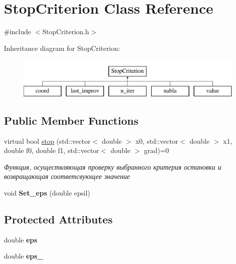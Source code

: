 \hypertarget{class_stop_criterion}{}\section{Stop\+Criterion Class Reference}
\label{class_stop_criterion}


{\ttfamily \#include $<$Stop\+Criterion.\+h$>$}

Inheritance diagram for Stop\+Criterion\+:\begin{figure}[H]
\begin{center}
\leavevmode
\includegraphics[height=2.000000cm]{class_stop_criterion}
\end{center}
\end{figure}
\subsection*{Public Member Functions}
\begin{DoxyCompactItemize}
\item 
\mbox{\label{class_stop_criterion_a5d6cb226bf9fc09d2924941f382f945a}} 
virtual bool \mbox{\hyperlink{class_stop_criterion_a5d6cb226bf9fc09d2924941f382f945a}{stop}} (std\+::vector$<$ double $>$ x0, std\+::vector$<$ double $>$ x1, double f0, double f1, std\+::vector$<$ double $>$ grad)=0
\begin{DoxyCompactList}\small\item\em Функция, осуществляющая проверку выбранного критерия остановки и возвращающая соответсвующее значение \end{DoxyCompactList}\item 
\mbox{\label{class_stop_criterion_abbd042a803864e4da709b29f5c34ef2d}} 
void {\bfseries Set\+\_\+eps} (double epsil)
\end{DoxyCompactItemize}
\subsection*{Protected Attributes}
\begin{DoxyCompactItemize}
\item 
\mbox{\label{class_stop_criterion_aa848cdc8c317a0788f3bc2daa9444b18}} 
double {\bfseries eps}
\item 
\mbox{\label{class_stop_criterion_ad42a03c72fd52d679c1bd787761cb73a}} 
double {\bfseries eps\+\_}
\end{DoxyCompactItemize}


